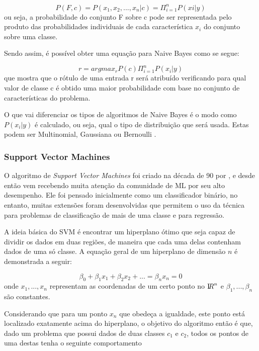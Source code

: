\begin{equation}
\label{e.naive}
P(F,c)=P(x_{1},x_{2},...,x_{n}|c)=\Pi_{i=1}^n P(xi|y)
\end{equation} ou seja, a probabilidade do conjunto F sobre c pode ser representada pelo produto das probabilidades individuais de cada característica $x_{i}$ do conjunto sobre uma classe.

Sendo assim, é possível obter uma equação para Naive Bayes como se segue:

\begin{equation}
\label{eq_final}
r = arg max_{r}P(c)\Pi_{i=1}^n P(x_{i}|y)
\end{equation} que mostra que o rótulo de uma entrada r será atribuído verificando para qual valor de classe c é obtido uma maior probabilidade com base no conjunto de características do problema.

O que vai diferenciar os tipos de algoritmos de Naive Bayes é o modo como $ P(x_{i}|y)$ é calculado, ou seja, qual o tipo de distribuição que será usada. Estas podem ser Multinomial, Gaussiana ou Bernoulli \cite{Metsis06spamfiltering}. 

\subsubsection{Support Vector Machines}

O algoritmo de \textit{Support Vector Machines} foi criado na década de 90 por \cite{cortes1995support}, e desde então vem recebendo muita atenção da comunidade de ML por seu alto desempenho. Ele foi pensado inicialmente como um classificador binário, no entanto, muitas extensões foram desenvolvidas que permitem o uso da técnica para problemas de classificação de mais de uma classe e para regressão.

A ideia básica do SVM é encontrar um hiperplano ótimo que seja capaz de dividir os dados em duas regiões, de maneira que cada uma delas contenham dados de uma só classe. A equação geral de um hiperplano de dimensão $n$ é demonstrada a seguir:

\begin{equation}
\label{e.hyperplane}
\beta_{0} + \beta_{1}x_{1} + \beta_{2}x_{2} + ... = \beta_{n}x_{n} = 0
\end{equation} onde $x_{1},...,x_{n}$ representam as coordenadas de um certo ponto no ${\textrm I\!R}^{n}$ e $\beta_{1},...,\beta_{n}$ são constantes. 

Considerando que para um ponto $x_{n}$ que obedeça a igualdade, este ponto está localizado exatamente acima do hiperplano, o objetivo do algoritmo então é que, dado um problema que possui dados de duas classes $c_{1}$ e $c_{2}$, todos os pontos de uma destas tenha o seguinte comportamento  

